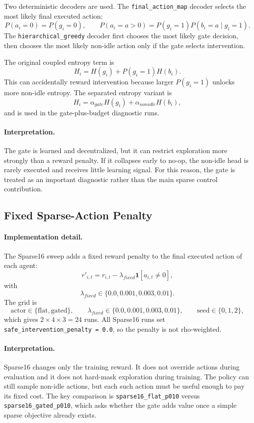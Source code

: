 Two deterministic decoders are used. The \texttt{final\_action\_map} decoder
selects the most likely final executed action:
\[
  P(a_i=0)=P(g_i=0),\qquad
  P(a_i=a>0)=P(g_i=1)P(b_i=a\mid g_i=1).
\]
The \texttt{hierarchical\_greedy} decoder first chooses the most likely gate
decision, then chooses the most likely non-idle action only if the gate selects
intervention.

The original coupled entropy term is
\[
  H_i=H(g_i)+P(g_i=1)H(b_i).
\]
This can accidentally reward intervention because larger \(P(g_i=1)\) unlocks
more non-idle entropy. The separated entropy variant is
\[
  H_i=\alpha_{gate}H(g_i)+\alpha_{nonidle}H(b_i),
\]
and is used in the gate-plus-budget diagnostic runs.

\paragraph{Interpretation.}
The gate is learned and decentralized, but it can restrict exploration more
strongly than a reward penalty. If it collapses early to no-op, the non-idle
head is rarely executed and receives little learning signal. For this reason,
the gate is treated as an important diagnostic rather than the main sparse
control contribution.

\subsection{Fixed Sparse-Action Penalty}
\label{subsec:sparse-control-fixed-penalty}

\paragraph{Implementation detail.}
The Sparse16 sweep adds a fixed reward penalty to the final executed action of
each agent:
\[
  r'_{i,t}=r_{i,t}
  -\lambda_{fixed}\mathbf{1}[a_{i,t}\neq0],
\]
with
\[
  \lambda_{fixed}\in\{0.0,0.001,0.003,0.01\}.
\]
The grid is
\[
  \text{actor}\in\{\text{flat},\text{gated}\},\qquad
  \lambda_{fixed}\in\{0.0,0.001,0.003,0.01\},\qquad
  \text{seed}\in\{0,1,2\},
\]
which gives \(2\times4\times3=24\) runs. All Sparse16 runs set
\texttt{safe\_intervention\_penalty = 0.0}, so the penalty is not rho-weighted.

\paragraph{Interpretation.}
Sparse16 changes only the training reward. It does not override actions during
evaluation and it does not hard-mask exploration during training. The policy can
still sample non-idle actions, but each such action must be useful enough to pay
its fixed cost. The key comparison is \texttt{sparse16\_flat\_p010} versus
\texttt{sparse16\_gated\_p010}, which asks whether the gate adds value once a
simple sparse objective already exists.


